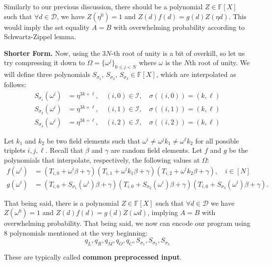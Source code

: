 \documentclass[../lecture-notes.tex]{subfiles}
\begin{document}
Similarly to our previous discussion, there should be a polynomial $Z \in
\mathbb{F}[X]$ such that $\forall d \in \mathcal{D}$, we have $Z(\eta^{0}) = 1$ and
$Z(d)f(d) = g(d)Z(\eta d)$. This would imply the set equality $A=B$ with
overwhelming probability according to Schwartz-Zippel lemma.

\textbf{Shorter Form.} Now, using the $3N$-th root of unity is a bit of overkill,
so let us try compressing it down to $\Omega = \{\omega^j\}_{0 \leq j < N}$
where $\omega$ is the $N$th root of unity. We will define three polynomials
$S_{\sigma_1}$, $S_{\sigma_2}$, $S_{\sigma_3} \in \mathbb{F}[X]$, which are
interpolated as follows:
\begin{align*}
    S_{\sigma_1}(\omega^i) &= \eta^{3k+\ell}, \quad (i, 0) \in \mathcal{I}, \quad \sigma((i, 0)) = (k, \ell) \\
    S_{\sigma_2}(\omega^i) &= \eta^{3k+\ell}, \quad (i, 1) \in \mathcal{I}, \quad \sigma((i, 1)) = (k, \ell) \\
    S_{\sigma_3}(\omega^i) &= \eta^{3k+\ell}, \quad (i, 2) \in \mathcal{I}, \quad \sigma((i, 2)) = (k, \ell)
\end{align*}

Let $k_1$ and $k_2$ be two field elements such that $\omega^i \neq \omega^j k_1
\neq \omega^{\ell} k_2$ for all possible triplets $i, j, \ell$. Recall that
$\beta$ and $\gamma$ are random field elements. Let $f$ and $g$ be the
polynomials that interpolate, respectively, the following values at $\Omega$:
\begin{align*}
    f(\omega^i) &=\left(T_{i,0} + \omega^i \beta + \gamma\right)\left(T_{i,1} + \omega^i k_1 \beta + \gamma\right)\left(T_{i,2} + \omega^i k_2 \beta + \gamma\right), \quad i \in [N] \\
    g(\omega^i) &= \left(T_{i,0} + S_{\sigma_1}(\omega^i) \beta + \gamma\right)\left(T_{i,0} + S_{\sigma_2}(\omega^i) \beta + \gamma\right)\left(T_{i,0} + S_{\sigma_3}(\omega^i) \beta + \gamma\right).
\end{align*}

That being said, there is a polynomial $Z \in \mathbb{F}[X]$ such that $\forall
d \in \mathcal{D}$ we have $Z(\omega^{0}) = 1$ and $Z(d)f(d) = g(d)Z(\omega d)$,
implying $A = B$ with overwhelming probability. That being said, we now can
encode our program using 8 polynomials mentioned at the very beginning:
\[q_L, q_R, q_M, q_O, q_C, S_{\sigma_1}, S_{\sigma_2}, S_{\sigma_3}\]

These are typically called \textbf{common preprocessed input}.
\end{document}
